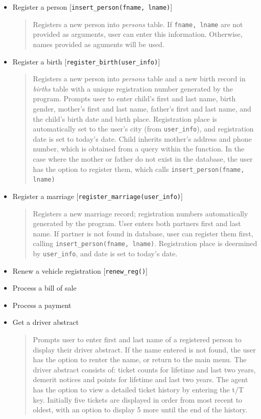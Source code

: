 \documentclass[10pt, a4paper]{article}
\begin{document}
{\begin{itemize}
\item Register a person [\texttt{insert\_person(fname, lname)}]
	\begin{quotation}
	\noindent Registers a new person into \emph{persons} table. If \texttt{fname, lname} are not provided as arguments, user can enter this information. Otherwise, names provided as aguments will be used. 
	\end{quotation}
	
\item Register a birth [\texttt{register\_birth(user\_info)}]
	\begin{quotation}
	\noindent Registers a new person into \emph{persons} table and a new birth record in \emph{births} table with a unique registration number generated by the program. Prompts user to enter child's first and last name, birth gender, mother's first and last name, father's first and last name, and the child's birth date and birth place. Registration place is automatically set to the user's city (from \texttt{user\_info}), and registration date is set to today's date. Child inherits mother's address and phone number, which is obtained from a query within the function. In the case where the mother or father do not exist in the database, the user has the option to register them, which calls \texttt{insert\_person(fname, lname)}
	\end{quotation}
	
\item Register a marriage [\texttt{register\_marriage(user\_info)}]
	\begin{quotation}
	\noindent Registers a new marriage record; registration numbers automatically generated by the program. User enters both partners first and last name. If partner is not found in database, user can register them first, calling \texttt{insert\_person(fname, lname)}. Registration place is deermined by \texttt{user\_info}, and date is set to today's date. 
	\end{quotation}
	
\item Renew a vehicle registration [\texttt{renew\_reg()}]

\item Process a bill of sale

\item Process a payment

\item Get a driver abstract
	\begin{quotation}
	\noindent Prompts user to enter first and last name of a registered person to display their driver abstract. If the name entered is not found, the user has the option to renter the name, or return to the main menu. The driver abstract consists of: ticket counts for lifetime and last two years, demerit notices and points for lifetime and last two years. The agent has the option to view a detailed ticket history by entering the t/T key. Initially five tickets are displayed in order from most recent to oldest, with an option to display 5 more until the end of the history.
	\end{quotation}


\end{itemize}}
\end{document}
